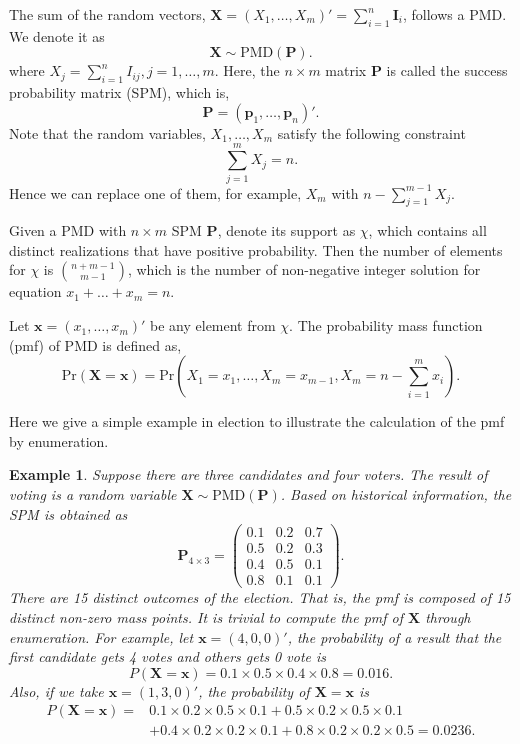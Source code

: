 \documentclass[12pt]{article}
\newcommand{\Ivec}{{\boldsymbol{I}}}
\newcommand{\Pmat}{\mathbf{P}}
\newcommand{\pvec}{\boldsymbol{p}}
\newcommand{\pr}{{\textrm{Pr}}}
\newcommand{\PMD}{\textrm{PMD}}
\newcommand{\Xvec}{\boldsymbol{X}}
\newcommand{\xvec}{\boldsymbol{x}}
\newcommand{\qedw}{\hfill \ensuremath{\Box}}
\newtheorem{example}{Example}
\begin{document}
The sum of the random vectors, $\Xvec = (X_{1}, \dots, X_{m})'= \sum_{i=1}^{n}\Ivec_{i}$, follows a PMD. We denote it as
$$\Xvec \sim \PMD(\Pmat).$$ where $X_{j} = \sum_{i=1}^{n} I_{ij}, j=1,\dots,m$. Here, the $n \times m$ matrix $\Pmat$ is called the success probability matrix (SPM), which is,
\begin{equation*}
\Pmat = (\pvec_{1}, \dots, \pvec_{n} )'.
\end{equation*}
Note that the random variables, $X_1, \dots, X_{m}$ satisfy the following constraint $$\sum_{j=1}^{m}X_{j} = n.$$ Hence we can replace one of them, for example, $X_m$ with $n-\sum_{j=1}^{m-1}X_j$.

Given a $\PMD$ with $n\times m $ SPM $\Pmat$, denote its support as $\chi$, which contains all distinct realizations that have positive probability. Then the number of elements for $\chi$ is $\binom{n+m-1}{m-1}$, which is the number of non-negative integer solution for equation $x_1 + \dots + x_m = n$.

 Let $\xvec = (x_1,\dots,x_m)'$ be any element from $\chi$. The probability mass function (pmf) of PMD is defined as,
$$\pr(\Xvec=\xvec) = \text{Pr} \left( X_1 = x_1, \dots, X_m = x_{m-1}, X_{m} = n-\sum_{i=1}^{m}x_i \right).$$

Here we give a simple example in election to illustrate the calculation of the pmf by enumeration.
\begin{example}%
Suppose there are three candidates and four voters. The result of voting is a random variable $\Xvec \sim \PMD(\Pmat)$. Based on historical information, the SPM is obtained as
\begin{equation*}
\Pmat_{4 \times 3} = \begin{pmatrix}
0.1 &  0.2 & 0.7\\
0.5 & 0.2 & 0.3\\
0.4 &  0.5 & 0.1\\
0.8 & 0.1 & 0.1
\end{pmatrix}.
\end{equation*}
There are 15 distinct outcomes of the election. That is, the pmf is composed of 15 distinct non-zero mass points. It is trivial to compute the pmf of $\Xvec$ through enumeration. For example, let $\xvec =  (4,0,0)'$, the probability of a result that the first candidate gets 4 votes and others gets 0 vote is
\begin{equation*}
P\left( \Xvec = \xvec \right) = 0.1\times 0.5 \times 0.4 \times 0.8 = 0.016.
\end{equation*}
Also, if we take $\xvec=(1,3,0)'$, the probability of $\Xvec = \xvec$ is
\begin{align*}
P\left( \Xvec = \xvec \right)  =  & 0.1\times 0.2 \times 0.5 \times 0.1 +
 0.5\times0.2\times0.5 \times 0.1 \\
 & + 0.4\times0.2\times0.2\times0.1 + 0.8\times0.2\times0.2\times0.5 = 0.0236.
\end{align*}
\end{example}
\end{document}
